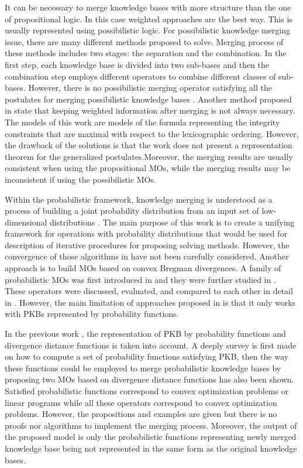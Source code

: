 \documentclass[]{iosart2c}
\begin{document}
  It can be necessary to merge knowledge bases with more structure than the one of propositional logic. In this case
  weighted approaches are the best way. This is usually represented using possibilistic logic. For possibilistic
  knowledge merging issue, there are many different methods \citep{14} \cite{15} \citep{16} proposed to solve. Merging process of these
  methods includes two stages: the separation and the combination. In the first step, each knowledge base is divided
  into two sub-bases and then the combination step employs different operators to combine different classes of
  sub-bases. However, there is no possibilistic merging operator satisfying all the postulates for merging possibilistic
  knowledge bases \cite{16}. Another method proposed in \cite{17} state that keeping weighted information after merging
  is not always necessary. The models of this work are models of the formula representing the integrity constraints
  that are maximal with respect to the lexicographic ordering. However, the drawback of the solutions is that the work
  does not present a representation theorem for the generalized postulates.Moreover, the merging results are usually
  consistent when using the propositional MOs, while the merging results may be inconsistent if using the possibilistic
  MOs.

  Within the probabilistic framework, knowledge merging is understood as a process of building a joint probability
  distribution from an input set of low-dimensional distributions \cite{18} \cite{19} \cite{20}. The main purpose of this work is to create
  a unifying framework for operations with probability distributions that would be used for description of iterative
  procedures for proposing solving methods. However, the convergence of those algorithms in \cite{18} \cite{19} \cite{20} have not been
  carefully considered. Another approach is to build MOs based on convex Bregman divergences. A family of probabilistic
  MOs was first introduced in \cite{21} and they were further studied in \cite{22} \cite{23}. These operators were discussed,
  evaluated, and compared to each other in detail in \cite{23}. However, the main limitation of approaches proposed
  in \cite{21} \cite{22} \cite{23} is that it only works with PKBs represented by probability functions.

  In the previous work \cite{24}, the representation of PKB by probability functions and divergence distance functions
  is taken into account. A deeply survey is first made on how to compute a set of probability functions satisfying PKB,
  then the way these functions could be employed to merge probabilistic knowledge bases by proposing two MOs based on
  divergence distance functions has also been shown. Satisfied probabilistic functions correspond to convex optimization
  problems or linear programs while all these operators correspond to convex optimization problems. However, the
  propositions and examples are given but there is no proofs nor algorithms to implement the merging process. Moreover,
  the output of the proposed model is only the probabilistic functions representing newly merged knowledge base being
  not represented in the same form as the original knowledge bases.
\end{document}
